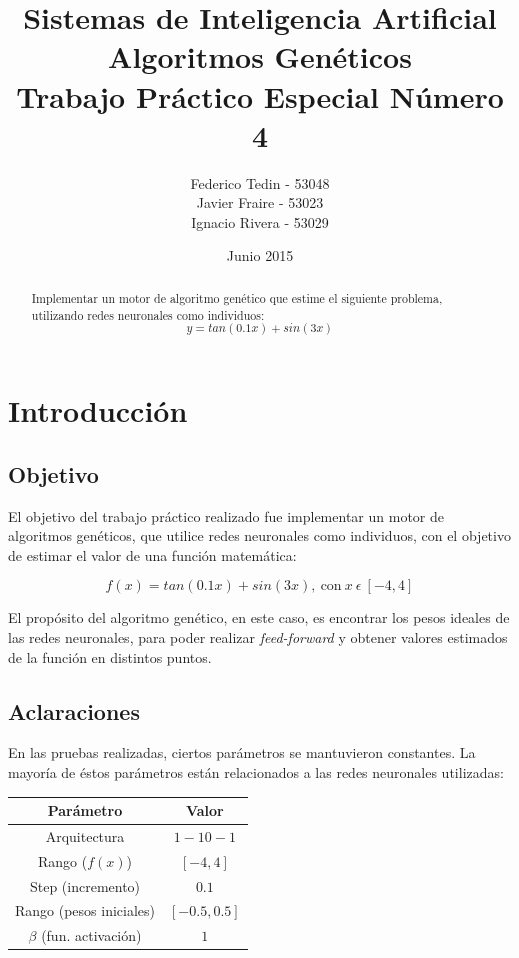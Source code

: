 \documentclass[11pt,a4paper]{article}
\title{Sistemas de Inteligencia Artificial\\Algoritmos Genéticos\\Trabajo Práctico Especial Número 4}
\date{Junio 2015}
\author{Federico Tedin - 53048\\Javier Fraire - 53023\\Ignacio Rivera - 53029}
\begin{document}
\maketitle
\thispagestyle{empty}

\vspace{5mm}
\renewcommand{\abstractname}{Resumen:}
\begin{abstract}

\centering
Implementar un motor de algoritmo genético que estime el siguiente problema, utilizando redes neuronales como individuos:
$$ y = tan(0.1x) + sin(3x) $$
\end{abstract}

\clearpage

\renewcommand{\contentsname}{Índice}
\tableofcontents
\thispagestyle{empty}
\clearpage
\setcounter{page}{1}

\section{Introducción}
\subsection{Objetivo}

El objetivo del trabajo práctico realizado fue implementar un motor de algoritmos genéticos, que utilice redes neuronales como individuos, con el objetivo de estimar el valor de una función matemática:

$$ f(x) = tan(0.1x) + sin(3x), \ \text{con} \ x \ \epsilon \ [-4, 4] $$

El propósito del algoritmo genético, en este caso, es encontrar los pesos ideales de las redes neuronales, para poder realizar \emph{feed-forward} y obtener valores estimados de la función en distintos puntos.

\subsection{Aclaraciones}

En las pruebas realizadas, ciertos parámetros se mantuvieron constantes.  La mayoría de éstos parámetros están relacionados a las redes neuronales utilizadas:

\begin{table}[H]
\centering
\begin{tabular}{|c|c|}
  \hline
  \textbf{Parámetro} & \textbf{Valor} \\
  \hline
  Arquitectura & $1-10-1$ \\
  \hline
  Rango ($f(x)$) & $[-4, 4]$ \\
  \hline
  Step (incremento) & $0.1$ \\
  \hline
  Rango (pesos iniciales) & $[-0.5, 0.5]$ \\
  \hline
  $\beta$ (fun. activación) & $1$ \\
  \hline
\end{tabular}
\end{table}
\end{document}
